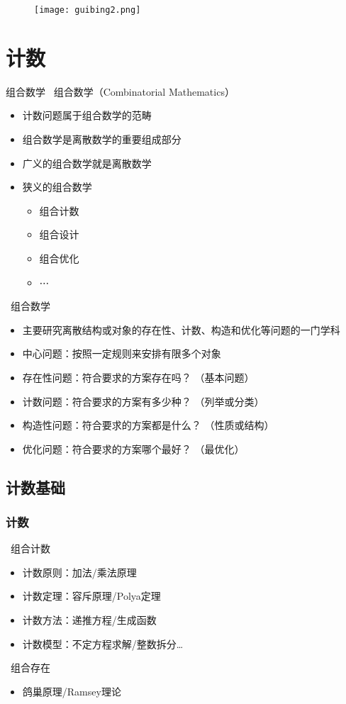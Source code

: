 \documentclass[UTF8]{report}
\theoremstyle{MyLineTheoremStyle} %
\theoremstyle{MyBlockTheoremStyle} %
\theoremstyle{MySubsubsectionStyle} %
\begin{document}
\begin{figure}[H]
    \centering
    \texttt{[image: guibing2.png]}
\end{figure}


\chapter{计数}

组合数学
\textbullet\ 组合数学（Combinatorial Mathematics）
\begin{itemize}
    \item 计数问题属于组合数学的范畴
    \item 组合数学是离散数学的重要组成部分
    \item 广义的组合数学就是离散数学
    \item 狭义的组合数学
    \begin{itemize}
        \item 组合计数
        \item 组合设计
        \item 组合优化
        \item ⋯
    \end{itemize}
\end{itemize}

\textbullet\ 组合数学
\begin{itemize}
    \item 主要研究离散结构或对象的存在性、计数、构造和优化等问题的一门学科
    \item 中心问题：按照一定规则来安排有限多个对象
    \item 存在性问题：符合要求的方案存在吗？ （基本问题）
    \item 计数问题：符合要求的方案有多少种？ （列举或分类）
    \item 构造性问题：符合要求的方案都是什么？ （性质或结构）
    \item 优化问题：符合要求的方案哪个最好？ （最优化）
\end{itemize}

\section{计数基础}
\subsection{计数}
\textbullet\ 组合计数
\begin{itemize}
    \item 计数原则：加法/乘法原理
    \item 计数定理：容斥原理/Polya定理
    \item 计数方法：递推方程/生成函数
    \item 计数模型：不定方程求解/整数拆分…
\end{itemize}
\textbullet\ 组合存在
\begin{itemize}
    \item 鸽巢原理/Ramsey理论
\end{itemize}
\end{document}
